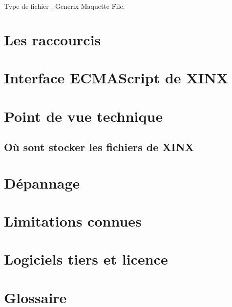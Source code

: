 \documentclass[a4paper,10pt,twoside]{book}
\begin{document}
Type de fichier : Generix Maquette File.

\appendix
\chapter{Les raccourcis}

\chapter{Interface ECMAScript de XINX}

\chapter{Point de vue technique}

\section{Où sont stocker les fichiers de XINX}

\chapter{Dépannage}

\chapter{Limitations connues}

\chapter{Logiciels tiers et licence}

\chapter{Glossaire}
\end{document}

